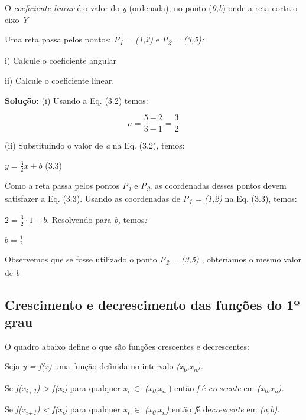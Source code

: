 \begin{caixa}
O \textit{coeficiente linear} é o valor do \textit{y }(ordenada), no ponto (\textit{0,b}) onde a reta corta o eixo \textit{Y}  
\end{caixa}

\begin{texemplo}
Uma reta passa pelos pontos: \textit{P\textsubscript{1} = (1,2) }e\textit{ P\textsubscript{2} = (3,5):}

i) Calcule o coeficiente angular

ii) Calcule o coeficiente linear.

\textbf{Solução: }(i) Usando a Eq. (3.2) temos:

 \[ a=\frac{5-2}{3-1}=\frac{3}{2} \] 

(ii) Substituindo o valor de \textit{a} na Eq. (3.2), temos:

 \( y=\frac{3}{2}x+b \) \tab (3.3)

Como a reta passa pelos pontos \textit{P\textsubscript{1 }}e\textit{ P\textsubscript{2}}, as coordenadas desses pontos devem satisfazer a Eq. (3.3). Usando as coordenadas de\textit{ P\textsubscript{1} = (1,2) }na Eq. (3.3), temos:

\textit{\( 2=\frac{3}{2} \cdot 1+b \)}. Resolvendo para\textit{ b, }temos\textit{:}

\( b=\frac{1}{2} \)  

Observemos que se fosse utilizado o ponto \textit{P\textsubscript{2} = (3,5)} , obteríamos o mesmo valor de \textit{b}  \qedsymbol{}
\end{texemplo}

\subsection{Crescimento e decrescimento das funções do 1º grau}

O quadro abaixo define o que são funções crescentes e decrescentes:

\begin{caixa}
Seja \textit{y = f(x)} uma função definida no intervalo \textit{(x\textsubscript{0},x\textsubscript{n}).} 

Se \textit{f(x\textsubscript{i+1}) > f(x\textsubscript{i})} para qualquer \textit{x\textsubscript{i }} $ \in $  \textit{(x\textsubscript{0},x\textsubscript{n}} ) então \textit{f} é \textit{crescente} em \textit{(x\textsubscript{0},x\textsubscript{n}).}

Se \textit{f(x\textsubscript{i+1}) <  f(x\textsubscript{i})} para qualquer \textit{x\textsubscript{i }} $ \in $  \textit{(x\textsubscript{0},x\textsubscript{n})} então \textit{f}é  de\textit{crescente} em \textit{(a,b).}
\end{caixa}

